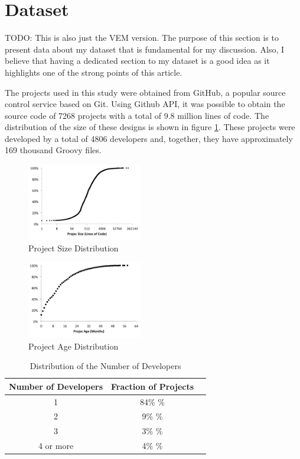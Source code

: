 \documentclass[preprint]{sigplanconf}
\begin{document}
\section{Dataset\label{sec:dataset}}
TODO: This is also just the VEM version. The purpose of this section is to present data about my dataset that is fundamental for my discussion. Also, I believe that having a dedicated section to my dataset is a good idea as it highlights one of the strong points of this article.

The projects used in this study were obtained from GitHub, a popular source control service based on Git.
Using Github API, it was possible to obtain the source code of 7268 projects with a total of 9.8 million lines of code. 
The distribution of the size of these designs is shown in figure \ref{fig:size_distribution}. 
These projects were developed by a total of 4806 developers and, together, they have approximately 169 thousand Groovy files.

\begin{figure}[ht]
\centering \includegraphics[width=0.45\textwidth]{images/size_distribution}
\caption{Project Size Distribution}
\label{fig:size_distribution} 
\end{figure}

\begin{figure}[ht]
\centering \includegraphics[width=0.45\textwidth]{images/age_distribution}
\caption{Project Age Distribution}
\label{fig:age_distribution} 
\end{figure}
 
\begin{table}[ht]
\caption{Distribution of the Number of Developers}


\centering{}%
\begin{tabular}{|c|c|c|}
\hline 
Number of Developers & Fraction of Projects\tabularnewline
\hline 
\hline 
1 & 84\% \%\tabularnewline
\hline 
2 & 9\% \%\tabularnewline
\hline 
3 & 3\% \%\tabularnewline
\hline 
4 or more & 4\% \%\tabularnewline
\hline 
\end{tabular}
\label{tab:number_of_developers}
\end{table}
\end{document}
